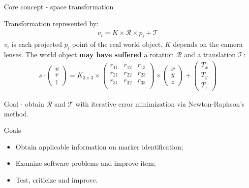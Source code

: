 \documentclass[10pt]{beamer}
\begin{document}
\begin{frame}[fragile]{Core concept - space transformation}

  Transformation represented by:
  \begin{align*}
    v_i=K\times\mathcal{R}\times p_i+\mathcal{T}
  \end{align*}
  $v_i$ is each projected $p_i$ point of the real world object. $K$ depends on the camera lenses.
  The world object \textbf{may have suffered} a rotation $\mathcal{R}$ and a translation $\mathcal{T}$:
  \begin{align}
    s \cdot
    \begin{pmatrix}
      u \\ v \\ 1
    \end{pmatrix}
    =
    K_{3 \times 3} \times
    \begin{pmatrix}
    r_{11} & r_{12} & r_{13} \\
    r_{21} & r_{22} & r_{23} \\
    r_{31} & r_{32} & r_{33} \\
    \end{pmatrix}
    \times
    \begin{pmatrix}
      x \\ y \\ z
    \end{pmatrix}
    +
    \begin{pmatrix}
      T_x \\ T_y \\ T_z
    \end{pmatrix}
  \end{align}

  Goal - obtain $\mathcal{R}$ and $\mathcal{T}$ with iterative error minimization via Newton-Raphson's method.
\end{frame}
\begin{frame}[fragile]{Goals}
  \begin{itemize}
    \item Obtain applicable information on marker identification;
    \item Examine software problems and improve item;
    \item Test, criticize and improve.
  \end{itemize}

\end{frame}

\end{document}
